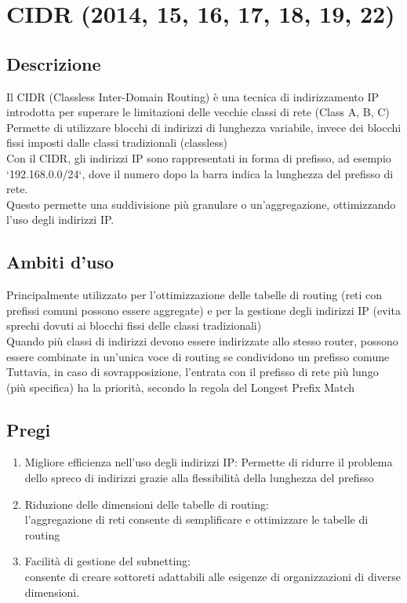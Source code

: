 \documentclass[10pt,oneside,a4paper]{article}
\begin{document}
\section{CIDR (2014, 15, 16, 17, 18, 19, 22)}
\subsection{Descrizione}
Il CIDR (Classless Inter-Domain Routing) è una tecnica di indirizzamento IP introdotta per superare le limitazioni delle vecchie classi di rete (Class A, B, C)\\
Permette di utilizzare blocchi di indirizzi di lunghezza variabile, invece dei blocchi fissi imposti dalle classi tradizionali (classless)\\
Con il CIDR, gli indirizzi IP sono rappresentati in forma di prefisso, ad esempio `192.168.0.0/24`, dove il numero dopo la barra indica la lunghezza del prefisso di rete.\\
Questo permette una suddivisione più granulare o un'aggregazione, ottimizzando l'uso degli indirizzi IP.
\subsection{Ambiti d'uso}
Principalmente utilizzato per l'ottimizzazione delle tabelle di routing (reti con prefissi comuni possono essere aggregate) e per la gestione degli indirizzi IP (evita sprechi dovuti ai blocchi fissi delle classi tradizionali)\\
Quando più classi di indirizzi devono essere indirizzate allo stesso router, possono essere combinate in un'unica voce di routing se condividono un prefisso comune\\
Tuttavia, in caso di sovrapposizione, l'entrata con il prefisso di rete più lungo (più specifica) ha la priorità, secondo la regola del Longest Prefix Match
\subsection{Pregi}
\begin{enumerate}
\item Migliore efficienza nell'uso degli indirizzi IP: Permette di ridurre il problema dello spreco di indirizzi grazie alla flessibilità della lunghezza del prefisso
\item Riduzione delle dimensioni delle tabelle di routing: \\
l'aggregazione di reti consente di semplificare e ottimizzare le tabelle di routing
\item Facilità di gestione del subnetting:\\
consente di creare sottoreti adattabili alle esigenze di organizzazioni di diverse dimensioni.
\end{enumerate}
\end{document}
